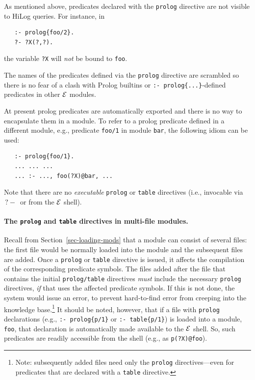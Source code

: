 \documentclass[11pt]{article}
\newcommand{\ERGO}{\mbox{\ensuremath{\cal{E}}\smaller{{\sc{RGO}}}}\xspace}
\newcommand{\FLSYSTEM}{\ERGO}
\newcommand{\query}{\mbox{$\, ?\! - \, $}}                  %
\begin{document}
As mentioned above, predicates declared with the \texttt{prolog} directive
are not visible to HiLog queries. For instance, in
\begin{verbatim}
   :- prolog{foo/2}.
   ?- ?X(?,?).
\end{verbatim}
the variable \texttt{?X} will \emph{not} be bound to \texttt{foo}.  

The names of the predicates defined via the \texttt{prolog} directive 
are scrambled so there is no fear of a clash with Prolog builtins or
\texttt{:- prolog\{...\}}-defined  predicates in other \FLSYSTEM modules.

At present prolog predicates are automatically exported and there is no way
to encapsulate them in a module. To refer to a prolog predicate defined in
a different module, e.g., predicate \texttt{foo/1} in module \texttt{bar},
the following idiom can be used:
\begin{verbatim}
   :- prolog{foo/1}.
   ... ... ...
   ... :- ..., foo(?X)@bar, ...
\end{verbatim}
Note that there are no \emph{executable}  \texttt{prolog} or \texttt{table}
directives (i.e., invocable via $\query$ or from the \FLSYSTEM shell).

\paragraph{The \texttt{prolog} and \texttt{table} directives in multi-file
  modules.}  
Recall from Section~\ref{sec-loading-mods} that a module can consist of
several files: the first file would be normally loaded into the module and
the subsequent files are added.
Once a \texttt{prolog} or \texttt{table} directive is issued, it affects
the compilation of the corresponding predicate symbols. The files added
after the file that contains the initial \texttt{prolog/table} directives
\emph{must} include
the necessary \texttt{prolog} directives, \emph{if} that uses the affected predicate symbols.
If this is not done, the system would issue an error, to prevent
hard-to-find error from creeping into the knowledge base.\footnote{
  Note: subsequently added files need only the \texttt{prolog}
  directives---even for predicates that are declared with a \texttt{table}
  directive. 
  }
It should be noted, however, that if a file with \texttt{prolog}
declarations (e.g., \texttt{:- prolog\{p/1\}} or \texttt{:- table\{p/1\}})  
is loaded into a module, \texttt{foo}, that declaration is automatically made
available to the \FLSYSTEM shell. So, such predicates are readily accessible
from the shell (e.g., as \texttt{p(?X)@foo}). 
\end{document}
